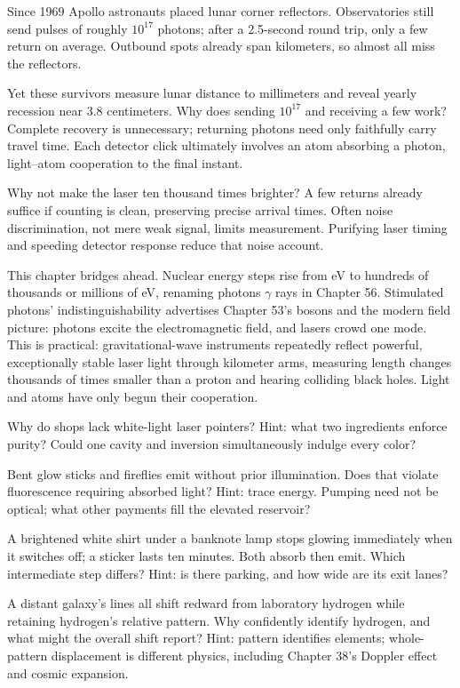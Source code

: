 
\begin{thought}
Since 1969 Apollo astronauts placed lunar corner reflectors. Observatories still send pulses of roughly \(10^{17}\) photons; after a 2.5-second round trip, only a few return on average. Outbound spots already span kilometers, so almost all miss the reflectors.

Yet these survivors measure lunar distance to millimeters and reveal yearly recession near 3.8 centimeters. Why does sending \(10^{17}\) and receiving a few work? Complete recovery is unnecessary; returning photons need only faithfully carry travel time. Each detector click ultimately involves an atom absorbing a photon, light--atom cooperation to the final instant.

Why not make the laser ten thousand times brighter? A few returns already suffice if counting is clean, preserving precise arrival times. Often noise discrimination, not mere weak signal, limits measurement. Purifying laser timing and speeding detector response reduce that noise account.
\end{thought}

\begin{mainline}
This chapter bridges ahead. Nuclear energy steps rise from eV to hundreds of thousands or millions of eV, renaming photons \(\gamma\) rays in Chapter 56. Stimulated photons' indistinguishability advertises Chapter 53's bosons and the modern field picture: photons excite the electromagnetic field, and lasers crowd one mode. This is practical: gravitational-wave instruments repeatedly reflect powerful, exceptionally stable laser light through kilometer arms, measuring length changes thousands of times smaller than a proton and hearing colliding black holes. Light and atoms have only begun their cooperation.
\end{mainline}

\begin{puzzles}
\item Why do shops lack white-light laser pointers? Hint: what two ingredients enforce purity? Could one cavity and inversion simultaneously indulge every color?
\item Bent glow sticks and fireflies emit without prior illumination. Does that violate fluorescence requiring absorbed light? Hint: trace energy. Pumping need not be optical; what other payments fill the elevated reservoir?
\item A brightened white shirt under a banknote lamp stops glowing immediately when it switches off; a sticker lasts ten minutes. Both absorb then emit. Which intermediate step differs? Hint: is there parking, and how wide are its exit lanes?
\item A distant galaxy's lines all shift redward from laboratory hydrogen while retaining hydrogen's relative pattern. Why confidently identify hydrogen, and what might the overall shift report? Hint: pattern identifies elements; whole-pattern displacement is different physics, including Chapter 38's Doppler effect and cosmic expansion.
\end{puzzles}

